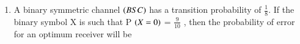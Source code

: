 \begin{enumerate}[label=\thesection.\arabic*.,ref=\thesection.\theenumi]
%
\item A binary symmetric channel $\left(BSC\right)$ has a transition probability of $\frac{1}{8}$. If the binary symbol X is such that P $\left(X = 0\right)$ = $\frac{9}{10}$ , then the probability of error for an optimum receiver will be 
\begin{enumerate}[]
\end{enumerate}
%
\solution




\end{enumerate}